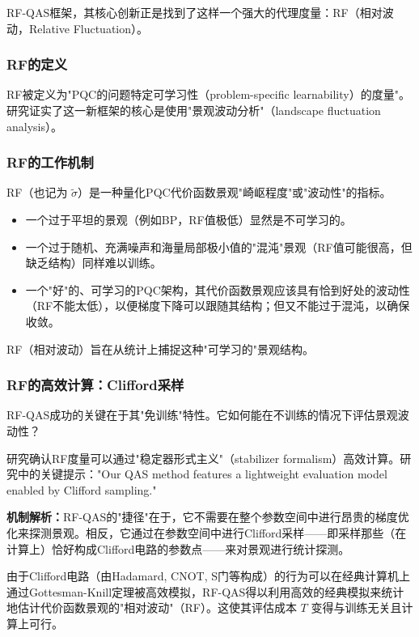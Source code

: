 \documentclass[12pt,a4paper]{article}
\begin{document}
RF-QAS框架，其核心创新正是找到了这样一个强大的代理度量：RF（相对波动，Relative Fluctuation）。

\subsubsection{RF的定义}

RF被定义为"PQC的问题特定可学习性（problem-specific learnability）的度量"。研究证实了这一新框架的核心是使用"景观波动分析"（landscape fluctuation analysis）。

\subsubsection{RF的工作机制}

RF（也记为 $\tilde{\sigma}$）是一种量化PQC代价函数景观"崎岖程度"或"波动性"的指标。

\begin{itemize}
\item 一个过于平坦的景观（例如BP，RF值极低）显然是不可学习的。
\item 一个过于随机、充满噪声和海量局部极小值的"混沌"景观（RF值可能很高，但缺乏结构）同样难以训练。
\item 一个"好"的、可学习的PQC架构，其代价函数景观应该具有恰到好处的波动性（RF不能太低），以便梯度下降可以跟随其结构；但又不能过于混沌，以确保收敛。
\end{itemize}

RF（相对波动）旨在从统计上捕捉这种"可学习的"景观结构。

\subsubsection{RF的高效计算：Clifford采样}

RF-QAS成功的关键在于其"免训练"特性。它如何能在不训练的情况下评估景观波动性？

研究确认RF度量可以通过"稳定器形式主义"（stabilizer formalism）高效计算。研究中的关键提示："Our QAS method features a lightweight evaluation model enabled by Clifford sampling."

\textbf{机制解析：}RF-QAS的"捷径"在于，它不需要在整个参数空间中进行昂贵的梯度优化来探测景观。相反，它通过在参数空间中进行Clifford采样——即采样那些（在计算上）恰好构成Clifford电路的参数点——来对景观进行统计探测。

由于Clifford电路（由Hadamard, CNOT, S门等构成）的行为可以在经典计算机上通过Gottesman-Knill定理被高效模拟，RF-QAS得以利用高效的经典模拟来统计地估计代价函数景观的"相对波动"（RF）。这使其评估成本 $T$ 变得与训练无关且计算上可行。
\end{document}
